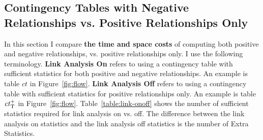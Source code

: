 \documentclass{sfuthesis}
\newcommand{\ct}{\mathit{ct}}
\begin{document}
\subsection{Contingency Tables with Negative Relationships vs. Positive Relationships Only} 
In this section I  compare \textbf{the time and space costs} of computing both positive and negative relationships, vs. positive relationships only.
I  use the following terminology. \textbf{Link Analysis On} refers to using a contingency table with sufficient statistics for both positive and negative relationships. 
An example is table $\ct$ in Figure~\ref{fig:flow}. 
\textbf{Link Analysis Off} refers to using a contingency table with sufficient statistics for positive relationships only. An example is table $\ct_{\true}^{+}$ %
 in Figure~\ref{fig:flow}.  Table~\ref{table:link-onoff} shows the  number of sufficient statistics required for link analysis on vs. off. The difference between the link analysis on statistics  and the link analysis off statistics is the number of Extra Statistics.
 
 \begin{table}[!h]
  \centering
  \caption{Number of Sufficient Statistics for Link Analysis On and Off. \\Extra Time refers to the total \MJ time (Table~\ref{table:cttimes} Col.2) minus the time for computing the positive statistics only.}
  \label{table:link-onoff}%
\end{table}%
 
\end{document}
